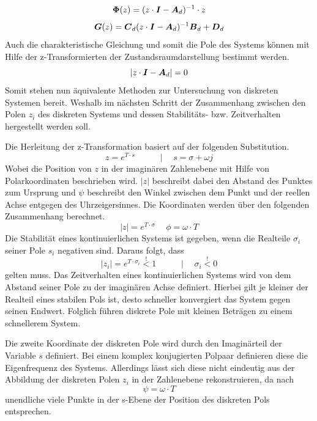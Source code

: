 \begin{equation}
\boldsymbol{\Phi}(z)=(z\cdot\boldsymbol{I}-\boldsymbol{A}_d)^{-1}\cdot z
\end{equation}
\begin{equation}
\boldsymbol{G}(z) = \boldsymbol{C}_d(z\cdot\boldsymbol{I}-\boldsymbol{A}_d)^{-1}\boldsymbol{B}_d+\boldsymbol{D}_d
\end{equation}
Auch die charakteristische Gleichung und somit die Pole des Systems können mit Hilfe der z-Transformierten der Zustandsraumdarstellung bestimmt werden.
\begin{equation}
\vert z \cdot \boldsymbol{I} - \boldsymbol{A}_d \vert = 0
\end{equation}
Somit stehen nun äquivalente Methoden zur Untersuchung von diskreten Systemen bereit. Weshalb im nächsten Schritt der Zusammenhang zwischen den Polen $z_i$ des diskreten Systems und dessen Stabilitäts- bzw. Zeitverhalten hergestellt werden soll.

Die Herleitung der z-Transformation basiert auf der folgenden Substitution.
\begin{equation}
z=e^{T\cdot s} \hspace{35pt}\vert \hspace{15pt} s=\sigma+\omega j
\end{equation}
Wobei die Position von $z$ in der imaginären Zahlenebene mit Hilfe von Polarkoordinaten beschrieben wird. $\vert z \vert$ beschreibt dabei den Abstand des Punktes zum Ursprung und $\psi$ beschreibt den Winkel zwischen dem Punkt und der reellen Achse entgegen des Uhrzeigersinnes. Die Koordinaten werden über den folgenden Zusammenhang berechnet.
\begin{equation}
\vert z\vert = e^{T\cdot \sigma} \hspace{15pt} \phi = \omega \cdot T
\end{equation}
Die Stabilität eines kontinuierlichen Systems ist gegeben, wenn die Realteile $\sigma_i$ seiner Pole $s_i$ negativen sind. Daraus folgt, dass 
\begin{equation}
\vert z_i \vert = e^{T\cdot \sigma_i} \overset{!}< 1 \hspace{35pt} \vert \hspace{15pt} \sigma_i \overset{!} < 0
\end{equation}
gelten muss. 
Das Zeitverhalten eines kontinuierlichen Systems wird von dem Abstand seiner Pole zu der imaginären Achse definiert. Hierbei gilt je kleiner der Realteil eines stabilen Pols ist, desto schneller konvergiert das System gegen seinen Endwert. Folglich führen diskrete Pole mit kleinen Beträgen zu einem schnellerem System.

Die zweite Koordinate der diskreten Pole wird durch den Imaginärteil der Variable $s$ definiert. Bei einem komplex konjugierten Polpaar definieren diese die Eigenfrequenz des Systems. Allerdings lässt sich diese nicht eindeutig aus der Abbildung der diskreten Polen $z_i$ in der Zahlenebene rekonstruieren, da nach
\begin{equation}
\psi = \omega \cdot T
\end{equation}
unendliche viele Punkte in der s-Ebene der Position des diskreten Pols entsprechen.